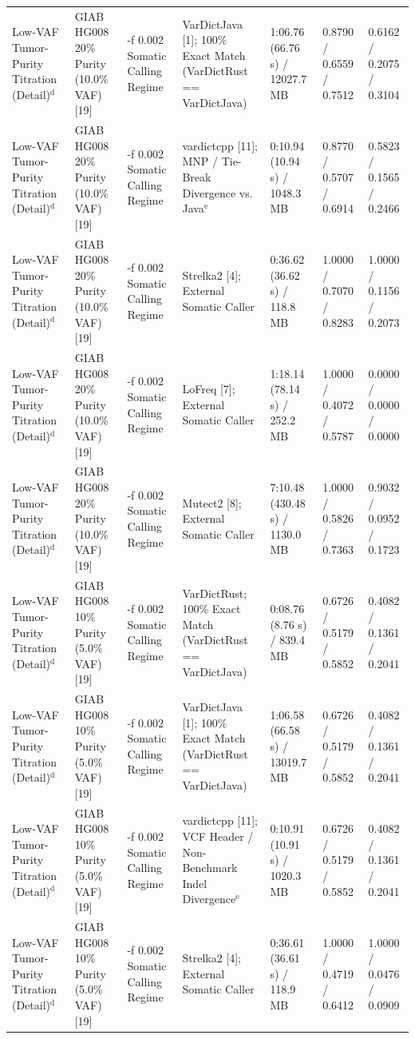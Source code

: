 \begin{table}[htbp]
{\begin{tabular}{lllllll}
Low-VAF Tumor-Purity Titration (Detail)$^{\text{d}}$ & GIAB HG008 20\% Purity (10.0\% VAF) [19] & -f 0.002 Somatic Calling Regime & VarDictJava [1]; 100\% Exact Match (VarDictRust == VarDictJava) & 1:06.76 (66.76 s) / 12027.7 MB & 0.8790 / 0.6559 / 0.7512 & 0.6162 / 0.2075 / 0.3104 \\
Low-VAF Tumor-Purity Titration (Detail)$^{\text{d}}$ & GIAB HG008 20\% Purity (10.0\% VAF) [19] & -f 0.002 Somatic Calling Regime & vardictcpp [11]; MNP / Tie-Break Divergence vs. Java$^{\text{e}}$ & 0:10.94 (10.94 s) / 1048.3 MB & 0.8770 / 0.5707 / 0.6914 & 0.5823 / 0.1565 / 0.2466 \\
Low-VAF Tumor-Purity Titration (Detail)$^{\text{d}}$ & GIAB HG008 20\% Purity (10.0\% VAF) [19] & -f 0.002 Somatic Calling Regime & Strelka2 [4]; External Somatic Caller & 0:36.62 (36.62 s) / 118.8 MB & 1.0000 / 0.7070 / 0.8283 & 1.0000 / 0.1156 / 0.2073 \\
Low-VAF Tumor-Purity Titration (Detail)$^{\text{d}}$ & GIAB HG008 20\% Purity (10.0\% VAF) [19] & -f 0.002 Somatic Calling Regime & LoFreq [7]; External Somatic Caller & 1:18.14 (78.14 s) / 252.2 MB & 1.0000 / 0.4072 / 0.5787 & 0.0000 / 0.0000 / 0.0000 \\
Low-VAF Tumor-Purity Titration (Detail)$^{\text{d}}$ & GIAB HG008 20\% Purity (10.0\% VAF) [19] & -f 0.002 Somatic Calling Regime & Mutect2 [8]; External Somatic Caller & 7:10.48 (430.48 s) / 1130.0 MB & 1.0000 / 0.5826 / 0.7363 & 0.9032 / 0.0952 / 0.1723 \\
Low-VAF Tumor-Purity Titration (Detail)$^{\text{d}}$ & GIAB HG008 10\% Purity (5.0\% VAF) [19] & -f 0.002 Somatic Calling Regime & VarDictRust; 100\% Exact Match (VarDictRust == VarDictJava) & 0:08.76 (8.76 s) / 839.4 MB & 0.6726 / 0.5179 / 0.5852 & 0.4082 / 0.1361 / 0.2041 \\
Low-VAF Tumor-Purity Titration (Detail)$^{\text{d}}$ & GIAB HG008 10\% Purity (5.0\% VAF) [19] & -f 0.002 Somatic Calling Regime & VarDictJava [1]; 100\% Exact Match (VarDictRust == VarDictJava) & 1:06.58 (66.58 s) / 13019.7 MB & 0.6726 / 0.5179 / 0.5852 & 0.4082 / 0.1361 / 0.2041 \\
Low-VAF Tumor-Purity Titration (Detail)$^{\text{d}}$ & GIAB HG008 10\% Purity (5.0\% VAF) [19] & -f 0.002 Somatic Calling Regime & vardictcpp [11]; VCF Header / Non-Benchmark Indel Divergence$^{\text{e}}$ & 0:10.91 (10.91 s) / 1020.3 MB & 0.6726 / 0.5179 / 0.5852 & 0.4082 / 0.1361 / 0.2041 \\
Low-VAF Tumor-Purity Titration (Detail)$^{\text{d}}$ & GIAB HG008 10\% Purity (5.0\% VAF) [19] & -f 0.002 Somatic Calling Regime & Strelka2 [4]; External Somatic Caller & 0:36.61 (36.61 s) / 118.9 MB & 1.0000 / 0.4719 / 0.6412 & 1.0000 / 0.0476 / 0.0909 \\

\end{tabular}}
\end{table}
